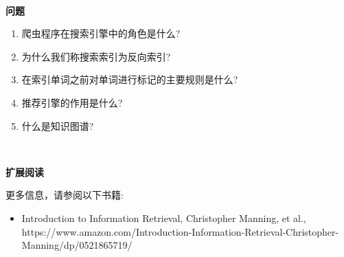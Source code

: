 \noindent\textbf{}\ \par
\textbf{问题} \ \par
\begin{enumerate}
	\item 爬虫程序在搜索引擎中的角色是什么?
	\item 为什么我们称搜索索引为反向索引?
	\item 在索引单词之前对单词进行标记的主要规则是什么?
	\item 推荐引擎的作用是什么?
	\item 什么是知识图谱?
\end{enumerate}

\noindent\textbf{}\ \par
\textbf{扩展阅读} \ \par
更多信息，请参阅以下书籍: \par
\begin{itemize}
	\item Introduction to Information Retrieval, Christopher Manning, et al., \\ https:/​/​www.​amazon.​com/Introduction-​Information-​Retrieval-​Christopher-​Manning/​dp/​0521865719/​
\end{itemize}

\newpage


































